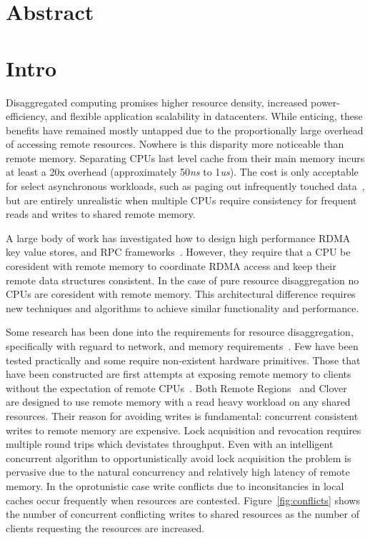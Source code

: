 \section{Abstract}

\section{Intro}
\label{sec:intro}

Disaggregated computing promises higher resource density, increased
power-efficiency, and flexible application scalability in datacenters.
While enticing, these benefits have remained mostly untapped due to
the proportionally large overhead of accessing remote resources.
Nowhere is this disparity more noticeable than remote memory.
Separating CPUs last level cache from their main memory incurs at
least a 20x overhead (approximately 50\textit{ns} to 1\textit{us}).
The cost is only acceptable for select asynchronous workloads, such as
paging out infrequently touched data~\cite{infiniswap,legoos,leap},
but are entirely unrealistic when multiple CPUs require consistency
for frequent reads and writes to shared remote memory.

A large body of work has investigated how to design high performance
RDMA key value stores, and RPC
frameworks~\cite{cell,sonuma,storm,farm,herd,erpc}. However, they
require that a CPU be coresident with remote memory to coordinate RDMA
access and keep their remote data structures consistent. In the case
of pure resource disaggregation no CPUs are coresident with remote
memory. This architectural difference requires new techniques and
algorithms to achieve similar functionality and performance. 

Some research has been done into the requirements for resource
disaggregation, specifically with reguard to network, and memory
requirements~\cite{requirements, aguilera2019designing, disandapp,
amanda-hotnets}. Few have been tested practically and some require
non-existent hardware primitives. Those that have been constructed are
first attempts at exposing remote memory to clients without the
expectation of remote CPUs~\cite{reigons, clover}. Both Remote
Regions~\cite{reigons} and Clover~\cite{clover} are designed to use
remote memory with a read heavy workload on any shared resources.
Their reason for avoiding writes is fundamental: concurrent consistent
writes to remote memory are expensive. Lock acquisition and revocation
requires multiple round trips which devistates throughput.  Even with
an intelligent concurrent algorithm to opportunistically avoid lock
acquisition the problem is pervasive due to the natural concurrency
and relatively high latency of remote memory.
In the oprotunistic case write conflicts due to inconsitancies in
local caches occur frequently when resources are contested.
Figure~\ref{fig:conflicts} shows the number of concurrent conflicting
writes to shared resources as the number of clients requesting the
resources are increased.

